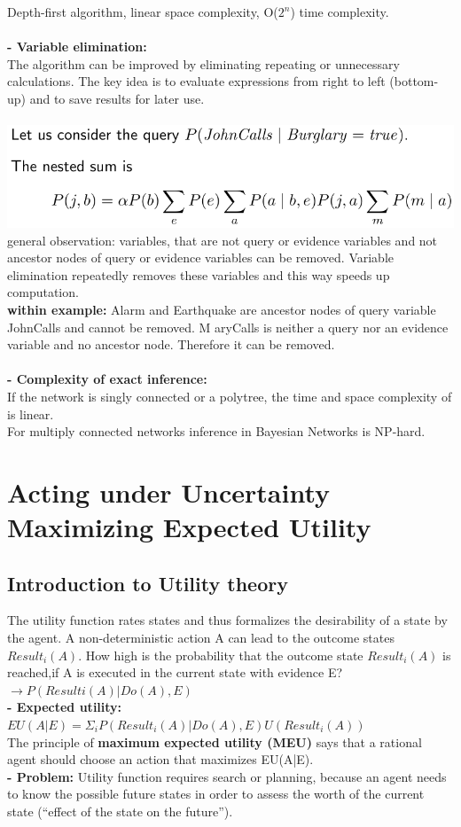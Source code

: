 \documentclass{article}
\begin{document}
Depth-first algorithm, linear space complexity, O($2^n$) time complexity.\\\\
\textbf{- Variable elimination: }\\
The algorithm can be improved by eliminating repeating or unnecessary calculations. The key idea is to evaluate expressions from right to left (bottom-up) and to save results for later use.\\\\
\includegraphics[scale=0.2]{75.png}\\
general observation: variables, that are not query or evidence variables and not ancestor nodes of query or evidence variables can be removed. Variable elimination repeatedly removes these variables and this way speeds up computation.\\
\textbf{within example: }Alarm and Earthquake are ancestor nodes of query
variable JohnCalls and cannot be removed. M aryCalls is neither a
query nor an evidence variable and no ancestor node. Therefore it can
be removed.\\\\
\textbf{- Complexity of exact inference: }\\
If the network is singly connected or a polytree, the time and space complexity of is linear.\\
For multiply connected networks inference in Bayesian Networks is
NP-hard.

\section{Acting under Uncertainty Maximizing Expected Utility}
\subsection{Introduction to Utility theory}

The utility function rates states and thus formalizes the desirability of a
state by the agent. A non-deterministic action A can lead to the outcome states  $Result_i(A)$. How high is the probability that the outcome state $Result_i(A)$ is reached,if A is executed in the current state with evidence E?\\
$→ P (Result i (A) | Do(A), E)$\\
\textbf{- Expected utility:}\\
$EU(A|E) = \Sigma_i P(Result_i(A)|Do(A),E) U(Result_i(A))$\\
The principle of \textbf{maximum expected utility (MEU)} says that a rational agent should choose an action that maximizes EU(A|E). \\
\textbf{- Problem: }Utility function requires search or planning, because an agent needs to know the possible future states in order to assess the worth of the current state (“effect of the state on the future”).\\
\end{document}
